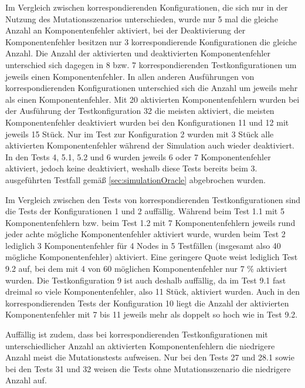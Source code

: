 Im Vergleich zwischen korrespondierenden Konfigurationen, die sich nur in der Nutzung des Mutationsszenarios unterschieden, wurde nur 5 mal die gleiche Anzahl an Komponentenfehler aktiviert, bei der Deaktivierung der Komponentenfehler besitzen nur 3 korrespondierende Konfigurationen die gleiche Anzahl.
Die Anzahl der aktivierten und deaktivierten Komponentenfehler unterschied sich dagegen in 8 bzw. 7 korrespondierenden Testkonfigurationen um jeweils einen Komponentenfehler.
In allen anderen Ausführungen von korrespondierenden Konfigurationen unterschied sich die Anzahl um jeweils mehr als einen Komponentenfehler.
Mit 20 aktivierten Komponentenfehlern wurden bei der Ausführung der Testkonfiguration 32 die meisten aktiviert, die meisten Komponentenfehler deaktiviert wurden bei den Konfigurationen 11 und 12 mit jeweils 15 Stück.
Nur im Test zur Konfiguration 2 wurden mit 3 Stück alle aktivierten Komponentenfehler während der Simulation auch wieder deaktiviert.
In den Tests 4, 5.1, 5.2 und 6 wurden jeweils 6 oder 7 Komponentenfehler aktiviert, jedoch keine deaktiviert, weshalb diese Tests bereits beim 3. ausgeführten Testfall gemäß \autoref{sec:simulationOracle} abgebrochen wurden.

Im Vergleich zwischen den Tests von korrespondierenden Testkonfigurationen sind die Tests der Konfigurationen 1 und 2 auffällig.
Während beim Test 1.1 mit 5 Komponentenfehlern bzw. beim Test 1.2 mit 7 Komponentenfehlern jeweils rund jeder achte mögliche Komponentenfehler aktiviert wurde, wurden beim Test 2 lediglich 3 Komponentenfehler für 4 Nodes in 5 Testfällen (insgesamt also 40 mögliche Komponentenfehler) aktiviert.
Eine geringere Quote weist lediglich Test 9.2 auf, bei dem mit 4 von 60 möglichen Komponentenfehler nur 7 \% aktiviert wurden.
Die Testkonfiguration 9 ist auch deshalb auffällig, da im Test 9.1 fast dreimal so viele Komponentenfehler, also 11 Stück, aktiviert wurden.
Auch in den korrespondierenden Tests der Konfiguration 10 liegt die Anzahl der aktivierten Komponentenfehler mit 7 bis 11 jeweils mehr als doppelt so hoch wie in Test 9.2.

Auffällig ist zudem, dass bei korrespondierenden Testkonfigurationen mit unterschiedlicher Anzahl an aktivierten Komponentenfehlern die niedrigere Anzahl meist die Mutationstests aufweisen.
Nur bei den Tests 27 und 28.1 sowie bei den Tests 31 und 32 weisen die Tests ohne Mutationsszenario die niedrigere Anzahl auf.

